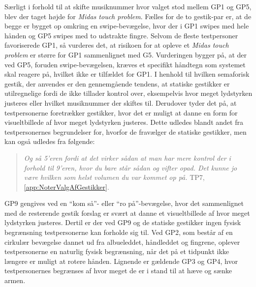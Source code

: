 Særligt i forhold til at skifte musiknummer hvor valget stod mellem GP1 og GP5, blev der taget højde for \textit{Midas touch problem}. Fælles for de to gestik-par er, at de begge er bygget op omkring en swipe-bevægelse, hvor der i GP1 swipes med hele hånden og GP5 swipes med to udstrakte fingre. Selvom de fleste testpersoner favoriserede GP1, så vurderes det, at risikoen for at opleve et \textit{Midas touch problem} er større for GP1 sammenlignet med G5. Vurderingen bygger på, at der ved GP5, foruden swipe-bevægelsen, kræves et specifikt håndtegn som systemet skal reagere på, hvilket ikke er tilfældet for GP1.\blankline
%
I henhold til hvilken semaforisk gestik, der anvendes er den gennemgående tendens, at statiske gestikker er utilregnelige fordi de ikke tillader kontrol over, eksempelvis hvor meget lydstyrken justeres eller hvilket musiknummer der skiftes til. Derudover tyder det på, at testpersonerne foretrækker gestikker, hvor det er muligt at danne en form for visueltbillede af hvor meget lydstyrken justeres. Dette udledes blandt andet fra testpersonernes begrundelser for, hvorfor de fravælger de statiske gestikker, men kan også udledes fra følgende:  
%
\begin{quotation}
	\noindent
	\textit{Og så 5'eren fordi at det virker sådan at man har mere kontrol der i forhold til 9'eren, hvor du bare står sådan og vifter opad. Det kunne jo være hvilken som helst volumen du var kommet op på.} TP7, \autoref{app:NoterValgAfGestikker}.
\noindent
\end{quotation}
%
GP9 gengives ved en \enquote{kom så}- eller \enquote{ro på}-bevægelse, hvor det sammenlignet med de resterende gestik forslag er svært at danne et visueltbillede af hvor meget lydstyrken justeres. Dertil er der ved GP9 og de statiske gestikker ingen fysisk begrænsning testpersonerne kan forholde sig til. Ved GP2, som består af en cirkulær bevægelse dannet ud fra albueleddet, håndleddet og fingrene, oplever testpersonerne en naturlig fysisk begrænsning, når det på et tidpunkt ikke længere er muligt at rotere hånden. Lignende er gældende GP3 og GP4, hvor testpersonernes begrænses af hvor meget de er i stand til at hæve og sænke armen.

